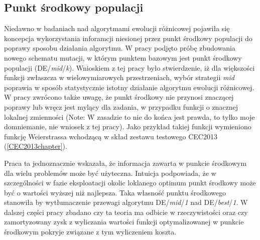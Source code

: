 \documentclass[12pt,a4paper]{report}
\begin{document}
{{{\subsection{Punkt środkowy populacji}
\label{MidPoint}
\par{
Niedawno w badaniach nad algorytmami ewolucji różnicowej \cite{DEmid} pojawiła się koncepcja wykorzystania inforamcji niesionej przez punkt środkowy populacji do poprawy sposobu działania algorytmu. W pracy \cite{DEmid} podjęto próbę zbudowania nowego schematu mutacji, w którym punktem bazowym jest punkt środkowy populacji (DE/\emph{mid}/\emph{k}). Wnioskiem z tej pracy było stwierdzenie, iż dla większości funkcji zwłaszcza w wielowymiarowych przestrzeniach, wybór strategii \emph{mid} poprawia w sposób statystycznie istotny działanie algorytmu ewolucji różnicowej. W pracy zwrócono także uwagę, że punkt środkowy nie przynosi znaczącej poprawy lub wręcz jest mylący dla zadania, w przypadku funkcji o znacznej lokalnej zmienności (Note: W zasadzie to nie do końca jest prawda, to tylko moje domniemanie, nie wniosek z tej pracy). Jako przykład takiej funkcji wymieniono funkcję Weierstrassa wchodzącą w skład zestawu testowego CEC2013 (\ref{CEC2013chapter}).
}
\par{
Praca ta jednoznacznie wskazała, że informacja zawarta w punkcie środkowym dla wielu problemów może być użyteczna. Intuicja podpowiada, że w szczególności w fazie eksploatacji okolic loklanego optimum punkt środkowy może być o wartości wyższej niż najlepsza. Taka własność punktu środkowego stanowiła by wytłumaczenie przewagi algorytmu DE/\emph{mid}/\emph{1} nad DE/\emph{best}/\emph{1}. W dalszej części pracy zbadano czy ta teoria ma odbicie w rzeczywistości oraz czy zamortyzowany zysk z wyliczania wartości funkcji optymalizowanej w punkcie środkowym pokryje związane z tym wyliczeniem koszta.
}
}}}
\end{document}
